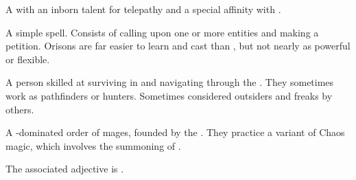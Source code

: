 \begin{gloss}
\begin{comment}
\paragraph{\nycaneer}
\end{comment}
\gitem{\nycaneer}
\index{\nycaneer}
A  with an inborn talent for telepathy and a special affinity with . 







\begin{comment}
\paragraph{orison}
\end{comment}
A simple spell. 
Consists of calling upon one or more entities and making a petition. 
Orisons are far easier to learn and cast than , but not nearly as powerful or flexible. 







\begin{comment}
\paragraph{\ranger}
\end{comment}
\gitem{\ranger}
\index{\ranger}
A person skilled at surviving in and navigating through the \Wylde{}. 
They sometimes work as pathfinders or hunters. 
Sometimes considered outsiders and freaks by others. 







\begin{comment}
\paragraph{\rethyax}
\end{comment}
\gitem[\rethyaxes]{\rethyax}
A -dominated order of mages, founded by the . 
They practice a variant of Chaos magic, which involves the summoning of . 

The associated adjective is \quo{\rethyactic}. 
\also{\Ortaica}








\end{gloss}
